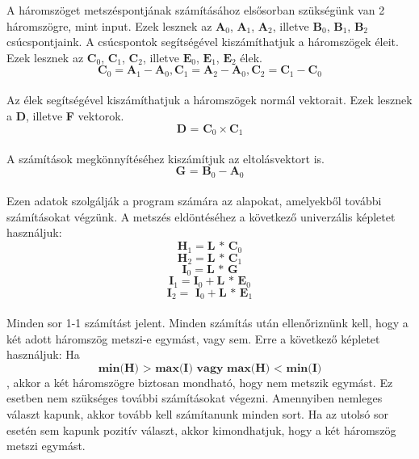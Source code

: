 A háromszöget metszéspontjának számításához elsősorban szükségünk van 2 háromszögre, mint input. Ezek lesznek az $\textbf{A}_0$, $\textbf{A}_1$, $\textbf{A}_2$, illetve $\textbf{B}_0$, $\textbf{B}_1$, $\textbf{B}_2$ csúcspontjaink. A csúcspontok segítségével kiszámíthatjuk a háromszögek éleit. Ezek lesznek az $\textbf{C}_0$, $\textbf{C}_1$, $\textbf{C}_2$, illetve $\textbf{E}_0$, $\textbf{E}_1$, $\textbf{E}_2$ élek. \\
$$\textbf{C}_0 = \textbf{A}_1 - \textbf{A}_0, \textbf{C}_1 = \textbf{A}_2 - \textbf{A}_0, \textbf{C}_2 = \textbf{C}_1 - \textbf{C}_0$$\\
Az élek segítségével kiszámíthatjuk a háromszögek normál vektorait. Ezek lesznek a \textbf{D}, illetve \textbf{F} vektorok.  \\
$$\textbf{D = C}_0 \times \textbf{C}_1$$\\
A számítások megkönnyítéséhez kiszámítjuk az eltolásvektort is.  \\
$$\textbf{G = B}_0 -\textbf{A}_0$$\\
Ezen adatok szolgálják a program számára az alapokat, amelyekből további számításokat végzünk. A metszés eldöntéséhez a következő univerzális képletet használjuk: 
$$\textbf{H}_1 = \textbf{L * C}_0$$
$$\textbf{H}_2 = \textbf{L * C}_1$$
$$\textbf{I}_0 = \textbf{L * G}$$
$$\textbf{I}_1 = \textbf{I}_0 + \textbf{L * E}_0$$
$$\textbf{I}_2 =\textbf{ I}_0 + \textbf{L * E}_1$$
\\
Minden sor 1-1 számítást jelent. Minden számítás után ellenőriznünk kell, hogy a két adott háromszög metszi-e egymást, vagy sem. Erre a következő képletet használjuk: Ha\\
$$\textbf{min(H) > max(I) vagy max(H) < min(I)}$$, akkor a két háromszögre biztosan mondható, hogy nem metszik egymást. Ez esetben nem szükséges további számításokat végezni. Amennyiben nemleges választ kapunk, akkor tovább kell számítanunk minden sort. Ha az utolsó sor esetén sem kapunk pozitív választ, akkor kimondhatjuk, hogy a két háromszög metszi egymást.


